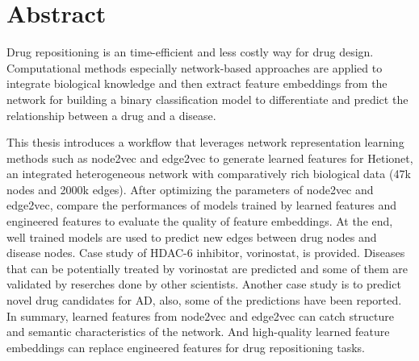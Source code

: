\chapter*{Abstract}

Drug repositioning is an time-efficient and less costly way for drug design. Computational methods especially network-based approaches are applied to integrate biological knowledge and then extract feature embeddings from the network for building a binary classification model to differentiate and predict the relationship between a drug and a disease.

This thesis introduces a workflow that leverages network representation learning methods such as node2vec and edge2vec to generate learned features for Hetionet, an integrated heterogeneous network with comparatively rich biological data (47k nodes and 2000k edges). After optimizing the parameters of node2vec and edge2vec, compare the performances of models trained by learned features and engineered features to evaluate the quality of feature embeddings. At the end, well trained models are used to predict new edges between drug nodes and disease nodes. Case study of HDAC-6 inhibitor, vorinostat, is provided. Diseases that can be potentially treated by vorinostat are predicted and some of them are validated by reserches done by other scientists. Another case study is to predict novel drug candidates for \ac{AD}, also, some of the predictions have been reported. In summary, learned features from node2vec and edge2vec can catch structure and semantic characteristics of the network. And high-quality learned feature embeddings can replace engineered features for drug repositioning tasks.